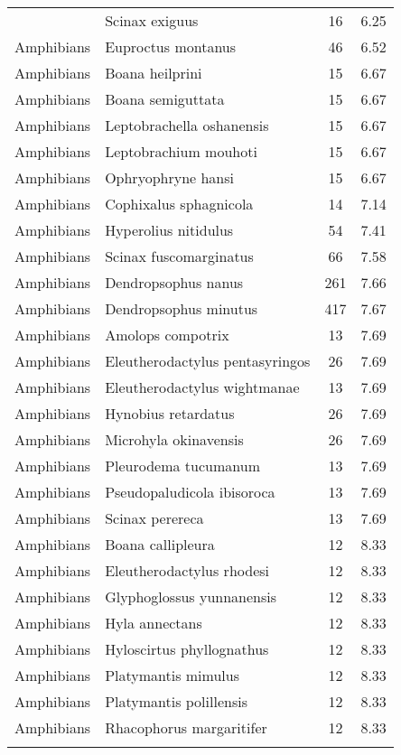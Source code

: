 \begin{longtable}{llcc}
{  Amphibians & Scinax exiguus &  16 & 6.25 \\ 
  Amphibians & Euproctus montanus &  46 & 6.52 \\ 
  Amphibians & Boana heilprini &  15 & 6.67 \\ 
  Amphibians & Boana semiguttata &  15 & 6.67 \\ 
  Amphibians & Leptobrachella oshanensis &  15 & 6.67 \\ 
  Amphibians & Leptobrachium mouhoti &  15 & 6.67 \\ 
  Amphibians & Ophryophryne hansi &  15 & 6.67 \\ 
  Amphibians & Cophixalus sphagnicola &  14 & 7.14 \\ 
  Amphibians & Hyperolius nitidulus &  54 & 7.41 \\ 
  Amphibians & Scinax fuscomarginatus &  66 & 7.58 \\ 
  Amphibians & Dendropsophus nanus & 261 & 7.66 \\ 
  Amphibians & Dendropsophus minutus & 417 & 7.67 \\ 
  Amphibians & Amolops compotrix &  13 & 7.69 \\ 
  Amphibians & Eleutherodactylus pentasyringos &  26 & 7.69 \\ 
  Amphibians & Eleutherodactylus wightmanae &  13 & 7.69 \\ 
  Amphibians & Hynobius retardatus &  26 & 7.69 \\ 
  Amphibians & Microhyla okinavensis &  26 & 7.69 \\ 
  Amphibians & Pleurodema tucumanum &  13 & 7.69 \\ 
  Amphibians & Pseudopaludicola ibisoroca &  13 & 7.69 \\ 
  Amphibians & Scinax perereca &  13 & 7.69 \\ 
  Amphibians & Boana callipleura &  12 & 8.33 \\ 
  Amphibians & Eleutherodactylus rhodesi &  12 & 8.33 \\ 
  Amphibians & Glyphoglossus yunnanensis &  12 & 8.33 \\ 
  Amphibians & Hyla annectans &  12 & 8.33 \\ 
  Amphibians & Hyloscirtus phyllognathus &  12 & 8.33 \\ 
  Amphibians & Platymantis mimulus &  12 & 8.33 \\ 
  Amphibians & Platymantis polillensis &  12 & 8.33 \\ 
  Amphibians & Rhacophorus margaritifer &  12 & 8.33 \\ 
}
\end{longtable}

